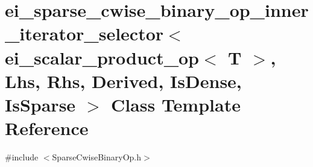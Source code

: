 \hypertarget{classei__sparse__cwise__binary__op__inner__iterator__selector_3_01ei__scalar__product__op_3_01_tea59c78454e1066b1083644fef716fd4}{\section{ei\-\_\-sparse\-\_\-cwise\-\_\-binary\-\_\-op\-\_\-inner\-\_\-iterator\-\_\-selector$<$ ei\-\_\-scalar\-\_\-product\-\_\-op$<$ T $>$, Lhs, Rhs, Derived, Is\-Dense, Is\-Sparse $>$ Class Template Reference}
\label{classei__sparse__cwise__binary__op__inner__iterator__selector_3_01ei__scalar__product__op_3_01_tea59c78454e1066b1083644fef716fd4}
}


{\ttfamily \#include $<$Sparse\-Cwise\-Binary\-Op.\-h$>$}

